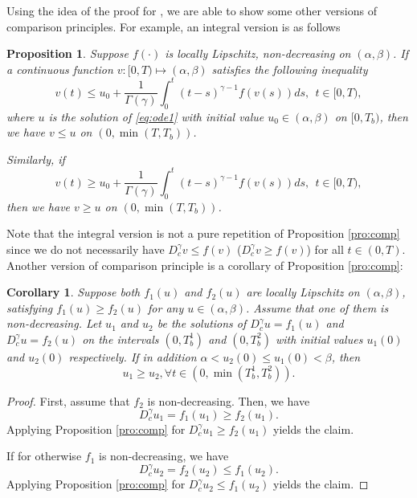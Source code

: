 \documentclass[12pt]{amsart}%
\newtheorem{pro}[thm]{Proposition}
\newtheorem{cor}[thm]{Corollary}
\theoremstyle{definition}
\theoremstyle{remark}
\renewcommand{\leq}{\leqslant}
\renewcommand{\geq}{\geqslant}
\renewcommand{\ge}{\geqslant}
\renewcommand{\le}{\leqslant}
\begin{document}
Using the idea of the proof for \cite[Theorem 7]{liliu16}, we are able to show some other versions of comparison principles. For example, an integral version is as follows
\begin{pro}
Suppose $f(\cdot)$ is locally Lipschitz, non-decreasing on $(\alpha, \beta)$. If a continuous function $v: [0, T)\mapsto (\alpha, \beta)$ satisfies the following inequality
\[
v(t)\le u_0+\frac{1}{\Gamma(\gamma)}\int_0^t(t-s)^{\gamma-1}f(v(s))ds,
~~t\in [0, T),
\]
where $u$ is the solution of \eqref{eq:ode1} with initial value $u_0\in (\alpha, \beta)$ on $[0, T_b)$, then we have $v\le u$ on $(0, \min(T, T_b))$. 

Similarly, if 
\[
v(t)\ge u_0+\frac{1}{\Gamma(\gamma)}\int_0^t(t-s)^{\gamma-1}f(v(s))ds,
~~t\in [0, T),
\]
then we have $v\ge u$ on $(0, \min(T, T_b))$.
\end{pro}
Note that the integral version is not a pure repetition of Proposition \ref{pro:comp} since we do not necessarily have $D_c^{\gamma}v\le f(v)$ ($D_c^{\gamma}v\ge f(v)$) for all $t\in (0, T)$. 
Another version of comparison principle is a corollary of Proposition \ref{pro:comp}:
\begin{cor}\label{cor:g}
Suppose both $f_1(u)$ and $f_2(u)$ are locally Lipschitz on $(\alpha, \beta)$, satisfying $f_1(u)\ge f_2(u)$ for any $u\in (\alpha, \beta)$. Assume that one of them is non-decreasing. Let $u_1$ and $u_2$ be the solutions of $D_c^{\gamma}u=f_1(u)$ and $D_c^{\gamma}u=f_2(u)$ on the intervals $(0,T_b^1)$ and $(0,T_b^2)$ with initial values $u_1(0)$ and $u_2(0)$ respectively. If in addition $\alpha<u_2(0)\le u_1(0)<\beta$, then \[
u_1\ge u_2, \forall t\in (0, \min(T_b^1, T_b^2)).
\]
\end{cor}
\begin{proof}
First, assume that $f_2$ is non-decreasing. Then, we have \[
D_c^{\gamma}u_1=f_1(u_1)\ge f_2(u_1).
\]
Applying Proposition \ref{pro:comp} for $D_c^{\gamma}u_1\ge f_2(u_1)$ yields the claim.

If for otherwise $f_1$ is non-decreasing, we have \[
D_c^{\gamma}u_2=f_2(u_2)\le f_1(u_2).
\]
Applying Proposition \ref{pro:comp} for $D_c^{\gamma}u_2\le f_1(u_2)$ yields the claim.
\end{proof}
\end{document}
